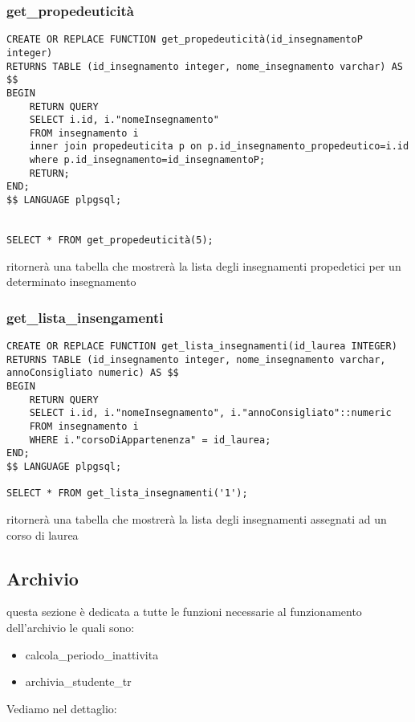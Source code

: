\subsubsection{get\_propedeuticità}\label{getPropedeuticità}
\begin{lstlisting}[style=sqlStyle]
CREATE OR REPLACE FUNCTION get_propedeuticità(id_insegnamentoP integer)
RETURNS TABLE (id_insegnamento integer, nome_insegnamento varchar) AS $$
BEGIN
    RETURN QUERY
    SELECT i.id, i."nomeInsegnamento"
    FROM insegnamento i
    inner join propedeuticita p on p.id_insegnamento_propedeutico=i.id
    where p.id_insegnamento=id_insegnamentoP;
    RETURN;
END;
$$ LANGUAGE plpgsql;


SELECT * FROM get_propedeuticità(5);
\end{lstlisting}

ritornerà una tabella che mostrerà la lista degli insegnamenti propedetici per un determinato insegnamento  
\subsubsection{get\_lista\_insengamenti}\label{getListaInsengamenti}
\begin{lstlisting}[style=sqlStyle]
CREATE OR REPLACE FUNCTION get_lista_insegnamenti(id_laurea INTEGER)
RETURNS TABLE (id_insegnamento integer, nome_insegnamento varchar, annoConsigliato numeric) AS $$
BEGIN
    RETURN QUERY
    SELECT i.id, i."nomeInsegnamento", i."annoConsigliato"::numeric
    FROM insegnamento i 
    WHERE i."corsoDiAppartenenza" = id_laurea;
END;
$$ LANGUAGE plpgsql;

SELECT * FROM get_lista_insegnamenti('1');
\end{lstlisting}

ritornerà una tabella che mostrerà la lista degli insegnamenti assegnati ad un corso di laurea 
\subsection{Archivio}\label{archivio}
questa sezione è dedicata a tutte le funzioni necessarie al funzionamento dell'archivio le quali sono:
\begin{itemize}
    \item calcola\_periodo\_inattivita
    \item archivia\_studente\_tr
\end{itemize}
Vediamo nel dettaglio:

